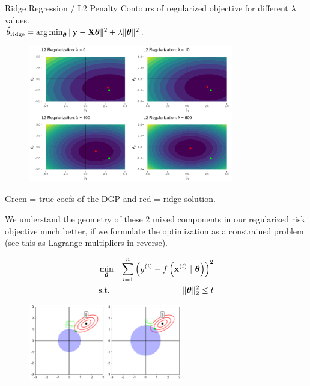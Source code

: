 \documentclass[11pt,compress,t,notes=noshow, xcolor=table]{beamer}
\begin{document}
\begin{vbframe}{Ridge Regression / L2 Penalty}
\framebreak 
Contours of regularized objective for different $\lambda$ values.\\
$ \hat{\theta}_{\text{ridge}} = \operatorname*{arg\,min}_{\bm{\theta}} \|\mathbf{y} - \mathbf{X} \bm{\theta}\|^2 + \lambda \|\bm{\theta}\|^2 $.

\begin{figure}
\includegraphics[width=0.8\textwidth]{figure/reg_contours_02.png}
\end{figure}
\vspace{-0.2cm}
Green  = true coefs of the DGP and red = ridge solution.

\framebreak

We understand the geometry of these 2 mixed components in our regularized risk objective much better, if we formulate the optimization as a constrained problem (see this as Lagrange multipliers in reverse).

\vspace{-0.5cm}

\begin{eqnarray*}
\min_{\bm{\theta}} && \sum\limits_{i=1}^n \left(y^{(i)} - f\left(\mathbf{x}^{(i)} ~|~ \bm{\theta}\right)\right)^2 \\
  \text{s.t. } && \|\bm{\theta}\|_2^2  \leq t \\
\end{eqnarray*}

\vspace{-1.0cm}

\begin{figure}
\includegraphics[width=0.6\textwidth]{figure/ridge_perspectives_03.png}
\end{figure}


\end{vbframe}
\end{document}
